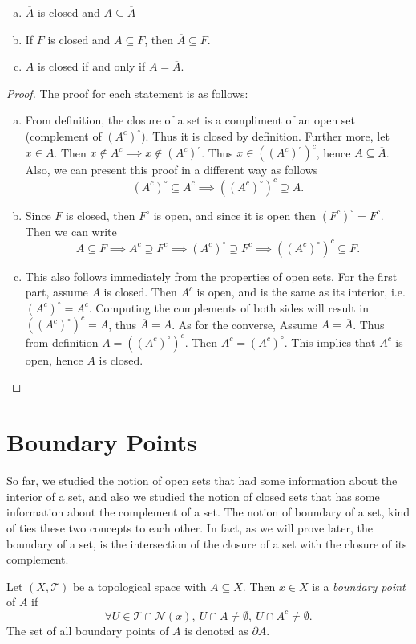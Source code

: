 \begin{proposition}
	\begin{enumerate}[(a)]
		\item $\overline{A}$ is closed and $A \subseteq \overline{A}$
		\item If $F$ is closed and $A \subseteq F$, then $\overline{A} \subseteq F$.
		\item $A$ is closed if and only if $A = \overline{A}$.
	\end{enumerate}
\end{proposition}

\begin{proof} The proof for each statement is as follows:
	\begin{enumerate}[(a)]
		\item From definition, the closure of a set is a compliment of an open set (complement of $(A^c)^\circ$). Thus it is closed by definition. Further more, let $x\in A$. Then $x\notin A^c \implies x\notin (A^c)^\circ$. Thus $x \in ((A^c)^\circ)^c$, hence $A \subseteq \overline{A}$. Also, we can present this proof in a different way as follows
		\[ (A^c)^\circ \subseteq A^c \implies ((A^c)^\circ)^c \supseteq A. \]
		\item Since $F$ is closed, then $F^\circ$ is open, and since it is open then $(F^c)^\circ = F^c$. Then we can write
		\[ A \subseteq F \implies A^c \supseteq F^c \implies (A^c)^\circ \supseteq F^c \implies ((A^c)^\circ)^c \subseteq F. \]
		\item This also follows immediately from the properties of open sets. For the first part, assume $A$ is closed. Then $A^c$ is open, and is the same as its interior, i.e. $(A^c)^\circ = A^c$. Computing the complements of both sides will result in $((A^c)^\circ)^c = A$, thus $\overline{A} = A$. As for the converse, Assume $A = \overline{A}$. Thus from definition $A = ((A^c)^\circ)^c$. Then $A^c = (A^c)^\circ$. This implies that $A^c$ is open, hence $A$ is closed. 
	\end{enumerate}
\end{proof}

\section{Boundary Points}
So far, we studied the notion of open sets that had some information about the interior of a set, and also we studied the notion of closed sets that has some information about the complement of a set. The notion of boundary of a set, kind of ties these two concepts to each other. In fact, as we will prove later, the boundary of a set, is the intersection of the closure of a set with the closure of its complement.
\begin{definition}
	Let $(X,\mathcal{T})$ be a topological space with $A \subseteq X$. Then $x\in X$ is a \emph{boundary point} of $A$ if 
	\[ \forall U\in \mathcal{T} \cap \mathcal{N}(x),\ U \cap A \neq \emptyset,\ U \cap A^c \neq \emptyset. \]
	The set of all boundary points of $A$ is denoted as $\partial A$. 
\end{definition}

